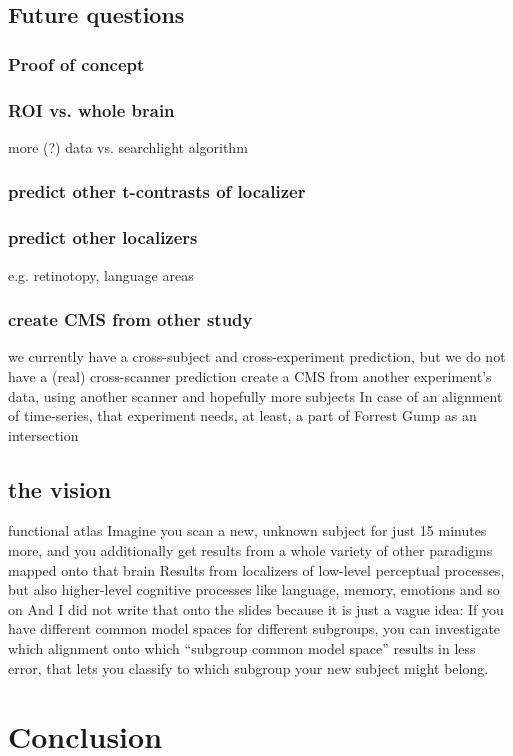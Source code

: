 \subsection{Future questions}
%

\subsubsection{Proof of concept}
%

\subsubsection{ROI vs. whole brain}
%
more (?) data vs. searchlight algorithm


\subsubsection{predict other t-contrasts of localizer}


\subsubsection{predict other localizers}
%
e.g. retinotopy, language areas


\subsubsection{create CMS from other study}
%
we currently have a cross-subject and cross-experiment prediction,
but we do not have a (real) cross-scanner prediction
%
create a CMS from another experiment’s data,
using another scanner and hopefully more subjects
%
In case of an alignment of time-series,
that experiment needs, at least, a part of Forrest Gump as an intersection


\subsection{the vision}
%
functional atlas
%
Imagine you scan a new, unknown subject for just 15 minutes more, and you
additionally get results from a whole variety of other paradigms mapped onto
that brain
%
Results from localizers of low-level perceptual processes, but also higher-level
cognitive processes like language, memory, emotions and so on
%
And I did not write that onto the slides because it is just a vague idea:
%
If you have different common model spaces for different subgroups, you can
investigate which alignment onto which ``subgroup common model space'' results
in less error, that lets you classify to which subgroup your new subject might
belong.


\section{Conclusion}
